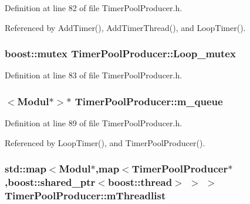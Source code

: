\-Definition at line 82 of file \-Timer\-Pool\-Producer.\-h.



\-Referenced by \-Add\-Timer(), \-Add\-Timer\-Thread(), and \-Loop\-Timer().

\hypertarget{classTimerPoolProducer_aea1db7284a5712c3f10d20311a46a273}{
\subsubsection[{\-Loop\-\_\-mutex}]{\setlength{\rightskip}{0pt plus 5cm}boost\-::mutex {\bf \-Timer\-Pool\-Producer\-::\-Loop\-\_\-mutex}}}\label{classTimerPoolProducer_aea1db7284a5712c3f10d20311a46a273}


\-Definition at line 83 of file \-Timer\-Pool\-Producer.\-h.

\hypertarget{classTimerPoolProducer_a1706efbc1e1a37f6fa05efb3fe5879f7}{
\subsubsection[{m\-\_\-queue}]{$<${\bf \-Modul}$\ast$$>$$\ast$ {\bf \-Timer\-Pool\-Producer\-::m\-\_\-queue}}}\label{classTimerPoolProducer_a1706efbc1e1a37f6fa05efb3fe5879f7}


\-Definition at line 89 of file \-Timer\-Pool\-Producer.\-h.



\-Referenced by \-Loop\-Timer(), and \-Timer\-Pool\-Producer().

\hypertarget{classTimerPoolProducer_ac578fc91c74fa55190cd661fc892b8cc}{
\subsubsection[{m\-Threadlist}]{\setlength{\rightskip}{0pt plus 5cm}std\-::map$<${\bf \-Modul}$\ast$,map$<${\bf \-Timer\-Pool\-Producer}$\ast$,boost\-::shared\-\_\-ptr$<$boost\-::thread$>$ $>$ $>$ {\bf \-Timer\-Pool\-Producer\-::m\-Threadlist}}}\label{classTimerPoolProducer_ac578fc91c74fa55190cd661fc892b8cc}


